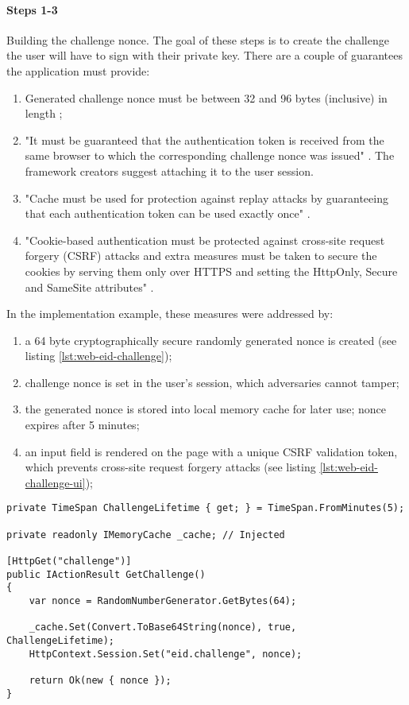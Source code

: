 \paragraph{Steps 1-3}

Building the challenge nonce. The goal of these steps is to create the challenge the user will have to sign with their private key. There are a couple of guarantees the application must provide:
\begin{enumerate}
  \item Generated challenge nonce must be between 32 and 96 bytes (inclusive) in length \cite{ria-webeid-source-web-eid-app-authenticate};
  \item "It must be guaranteed that the authentication token is received from the same browser to which the corresponding challenge nonce was issued" \cite{ria-webeid-source-web-eid-authtoken-validation-java-readme}. The framework creators suggest attaching it to the user session.
  \item "Cache must be used for protection against replay attacks by guaranteeing that each authentication token can be used exactly once" \cite{ria-webeid-source-web-eid-authtoken-validation-java-readme}.
  \item "Cookie-based authentication must be protected against cross-site request forgery (CSRF) attacks and extra measures must be taken to secure the cookies by serving them only over HTTPS and setting the HttpOnly, Secure and SameSite attributes" \cite{ria-webeid-source-web-eid-authtoken-validation-java-readme}.
\end{enumerate}

In the implementation example, these measures were addressed by:
\begin{enumerate}
  \item a 64 byte cryptographically secure randomly generated nonce is created (see listing \ref{lst:web-eid-challenge});
  \item challenge nonce is set in the user's session, which adversaries cannot tamper;
  \item the generated nonce is stored into local memory cache for later use; nonce expires after 5 minutes;
  \item an input field is rendered on the page with a unique CSRF validation token, which prevents cross-site request forgery attacks (see listing \ref{lst:web-eid-challenge-ui});
\end{enumerate}

\begin{lstlisting}[caption={Web eID Challenge Endpoint}, label={lst:web-eid-challenge}]
private TimeSpan ChallengeLifetime { get; } = TimeSpan.FromMinutes(5);

private readonly IMemoryCache _cache; // Injected

[HttpGet("challenge")]
public IActionResult GetChallenge()
{
    var nonce = RandomNumberGenerator.GetBytes(64);

    _cache.Set(Convert.ToBase64String(nonce), true, ChallengeLifetime);
    HttpContext.Session.Set("eid.challenge", nonce);

    return Ok(new { nonce });
}
\end{lstlisting}


